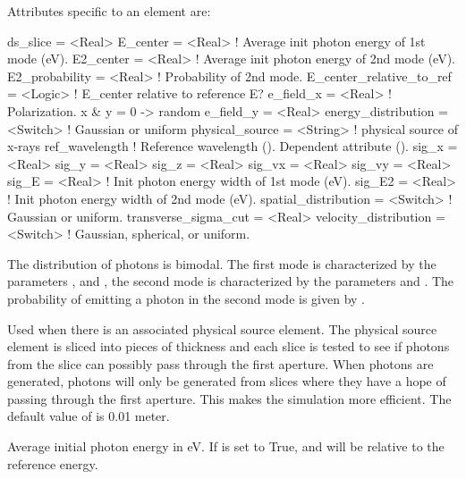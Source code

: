 {
Attributes specific to an  element are:
\begin{example}
  ds_slice                 = <Real>
  E_center                 = <Real>    ! Average init photon energy of 1st mode (eV).
  E2_center                = <Real>    ! Average init photon energy of 2nd mode (eV).
  E2_probability           = <Real>    ! Probability of 2nd mode.
  E_center_relative_to_ref = <Logic>   ! E_center relative to reference E?
  e_field_x                = <Real>    ! Polarization. x & y = 0 -> random
  e_field_y                = <Real>
  energy_distribution      = <Switch>  ! Gaussian or uniform
  physical_source          = <String>  ! physical source of x-rays
  ref_wavelength                       ! Reference wavelength (). Dependent attribute ().
  sig_x                    = <Real>
  sig_y                    = <Real>
  sig_z                    = <Real>
  sig_vx                   = <Real>
  sig_vy                   = <Real>
  sig_E                    = <Real>    ! Init photon energy width of 1st mode (eV).
  sig_E2                   = <Real>    ! Init photon energy width of 2nd mode (eV).
  spatial_distribution     = <Switch>  ! Gaussian or uniform. 
  transverse_sigma_cut     = <Real>
  velocity_distribution    = <Switch>  ! Gaussian, spherical, or uniform. 
\end{example}

The distribution of photons is bimodal. The first mode is characterized by the parameters
, and , the second mode is characterized by the parameters  and
. The probability of emitting a photon in the second mode is given by .

  \begin{description}
  \item[\vn{ds_slice}] \Newline
Used when there is an associated physical source element. The physical
source element is sliced into pieces of thickness  and
each slice is tested to see if photons from the slice can possibly
pass through the first aperture. When photons are generated, photons
will only be generated from slices where they have a hope of passing
through the first aperture. This makes the simulation more efficient.
The default value of  is 0.01 meter.

  \item[\vn{E_center}, \vn{E2_center}] \Newline
Average initial photon energy in eV. If  is set to True, 
and  will be relative to the reference energy.


\end{description}}
